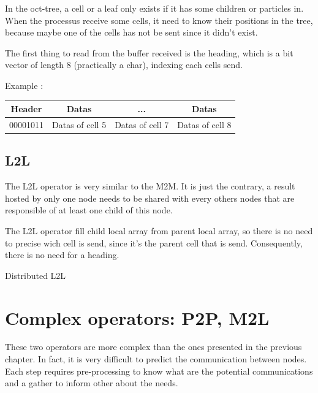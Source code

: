 \documentclass[12pt,letterpaper,titlepage]{report}
\begin{document}
In the oct-tree, a cell or a leaf only exists if it has some children
or particles in. When the processus receive some cells, it need to
know their positions in the tree, because maybe one of the cells has
not be sent since it didn't exist.

The first thing to read from the buffer received is the heading, which
is a bit vector of length 8 (practically a char), indexing each cells
send.


Example :
\begin{tabular}{| c || c | c | c |}
  \hline
  Header & Datas & ... & Datas \\
  \hline
  00001011 & Datas of cell 5 & Datas of cell 7 & Datas of cell 8 \\
  \hline
\end{tabular}


\clearpage
\section{L2L}
The L2L operator is very similar to the M2M.  It is just the contrary,
a result hosted by only one node needs to be shared with every others
nodes that are responsible of at least one child of this node.

The L2L operator fill child local array from parent local array, so
there is no need to precise wich cell is send, since it's the parent
cell that is send. Consequently, there is no need for a heading.

\BlankLine
\begin{algorithm}[H]
  \LinesNumbered
  \SetAlgoLined
  \BlankLine
  \BlankLine
  \caption{Distributed L2L}
\end{algorithm}
\chapter{Complex operators: P2P, M2L}
These two operators are more complex than the ones presented in the previous chapter.
In fact, it is very difficult to predict the communication between nodes.
Each step requires pre-processing to know what are the potential communications and a gather to inform other about the needs.
\end{document}
